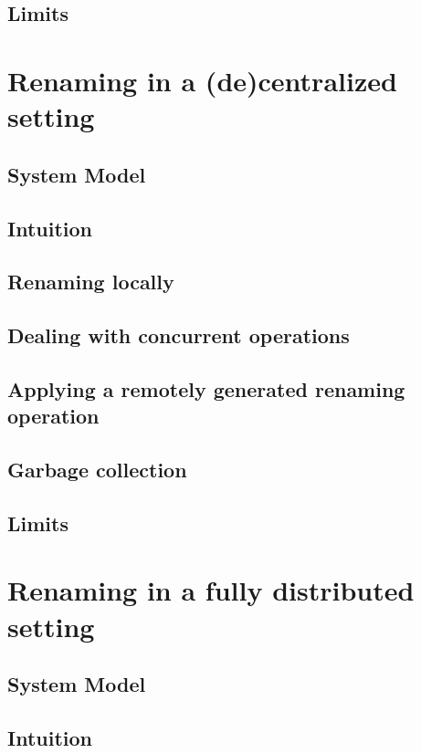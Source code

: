 \documentclass{article}
\begin{document}
\subsection{Limits}


\section{Renaming in a (de)centralized setting}

\subsection{System Model}
\subsection{Intuition}
\subsection{Renaming locally}
\subsection{Dealing with concurrent operations}
\subsection{Applying a remotely generated renaming operation}
\subsection{Garbage collection}
\subsection{Limits}

\section{Renaming in a fully distributed setting}

\subsection{System Model}
\subsection{Intuition}
\end{document}
